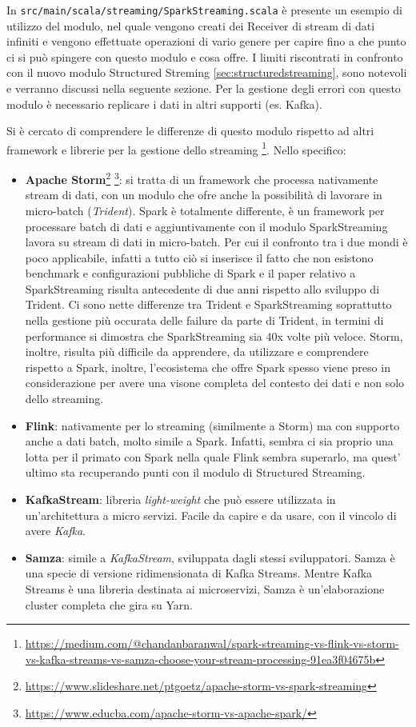 \documentclass[12pt,italian]{article}
\begin{document}
\par In \texttt{src/main/scala/streaming/SparkStreaming.scala} è presente un esempio di utilizzo del modulo, nel quale vengono creati dei Receiver di stream di dati infiniti e vengono effettuate operazioni di vario genere per capire fino a che punto ci si può spingere con questo modulo e cosa offre. I limiti riscontrati in confronto con il nuovo modulo Structured Streming \ref{sec:structuredstreaming}, sono notevoli e verranno discussi nella seguente sezione.
Per la gestione degli errori con questo modulo è necessario replicare i dati in altri supporti (es. Kafka).
\par Si è cercato di comprendere le differenze di questo modulo rispetto ad altri framework e librerie per la gestione dello streaming \footnote{\url{https://medium.com/@chandanbaranwal/spark-streaming-vs-flink-vs-storm-vs-kafka-streams-vs-samza-choose-your-stream-processing-91ea3f04675b}}. Nello specifico:
\begin{itemize}
	\item \textbf{Apache Storm}\footnote{\url{https://www.slideshare.net/ptgoetz/apache-storm-vs-spark-streaming}} \footnote{\url{https://www.educba.com/apache-storm-vs-apache-spark/}}: si tratta di un framework che processa nativamente stream di dati, con un modulo che ofre anche la possibilità di lavorare in micro-batch (\textit{Trident}). Spark è totalmente differente, è un framework per processare batch di dati e aggiuntivamente con il modulo SparkStreaming lavora su stream di dati in micro-batch. Per cui il confronto tra i due mondi è poco applicabile, infatti a tutto ciò si inserisce il fatto che non esistono benchmark e configurazioni pubbliche di Spark e il paper relativo a SparkStreaming\cite{sparkStreaming} risulta antecedente di due anni rispetto allo sviluppo di Trident. Ci sono nette differenze tra Trident e SparkStreaming soprattutto nella gestione più occurata delle failure da parte di Trident, in termini di performance si dimostra che SparkStreaming sia 40x volte più veloce.
	Storm, inoltre, risulta più difficile da apprendere, da utilizzare e comprendere rispetto a Spark, inoltre, l'ecosistema che offre Spark spesso viene preso in considerazione per avere una visone completa del contesto dei dati e non solo dello streaming.
	\item \textbf{Flink}: nativamente per lo streaming (similmente a Storm) ma con supporto anche a dati batch, molto simile a Spark. Infatti, sembra ci sia proprio una lotta per il primato con Spark nella quale Flink sembra superarlo, ma quest' ultimo sta recuperando punti con il modulo di Structured Streaming.
	\item \textbf{KafkaStream}: libreria \textit{light-weight} che può essere utilizzata in un'architettura a micro servizi. Facile da capire e da usare, con il vincolo di avere \textit{Kafka}. 
	\item \textbf{Samza}: simile a \textit{KafkaStream}, sviluppata dagli stessi sviluppatori. Samza è una specie di versione ridimensionata di Kafka Streams. Mentre Kafka Streams è una libreria destinata ai microservizi, Samza è un'elaborazione cluster completa che gira su Yarn.
\end{itemize}
\end{document}
